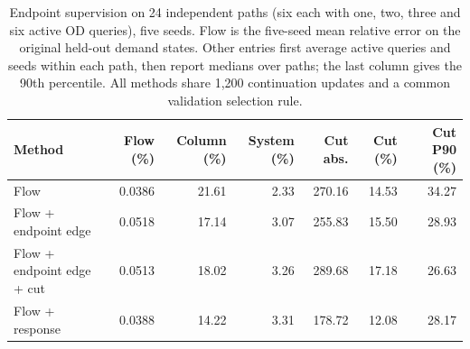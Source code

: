 \begin{table}[t]\centering\small
\caption{Endpoint supervision on 24 independent paths (six each with one, two, three and six active OD queries), five seeds. Flow is the five-seed mean relative error on the original held-out demand states. Other entries first average active queries and seeds within each path, then report medians over paths; the last column gives the 90th percentile. All methods share 1,200 continuation updates and a common validation selection rule.}
\label{tab:pairs-v102}
\begin{tabular}{lrrrrrr}\toprule
Method & Flow (\%) & Column (\%) & System (\%) & Cut abs. & Cut (\%) & Cut P90 (\%)\\\midrule
Flow & 0.0386 & 21.61 & 2.33 & 270.16 & 14.53 & 34.27\\
Flow + endpoint edge & 0.0518 & 17.14 & 3.07 & 255.83 & 15.50 & 28.93\\
Flow + endpoint edge + cut & 0.0513 & 18.02 & 3.26 & 289.68 & 17.18 & 26.63\\
Flow + response & 0.0388 & 14.22 & 3.31 & 178.72 & 12.08 & 28.17\\
\bottomrule\end{tabular}\end{table}
